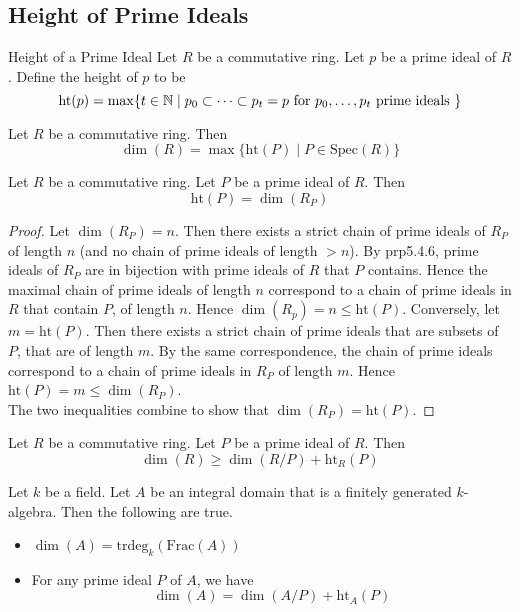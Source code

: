 \documentclass[a4paper]{article}
\begin{document}
\subsection{Height of Prime Ideals}
\begin{defn}{Height of a Prime Ideal}{} Let $R$ be a commutative ring. Let $p$ be a prime ideal of $R$. Define the height of $p$ to be $$\text{ht}(p)=\max\{t\in\mathbb{N}\;|\;p_0\subset\dots\subset p_t=p\text{ for }p_0,\dots,p_t\text{ prime ideals }\}$$
\end{defn}

\begin{lmm}{}{} Let $R$ be a commutative ring. Then $$\dim(R)=\max\{\text{ht}(P)\;|\;P\in\text{Spec}(R)\}$$
\end{lmm}

\begin{lmm}{}{} Let $R$ be a commutative ring. Let $P$ be a prime ideal of $R$. Then $$\text{ht}(P)=\dim(R_P)$$ 
\begin{proof}
Let $\dim(R_P)=n$. Then there exists a strict chain of prime ideals of $R_P$ of length $n$ (and no chain of prime ideals of length $>n$). By prp5.4.6, prime ideals of $R_P$ are in bijection with prime ideals of $R$ that $P$ contains. Hence the maximal chain of prime ideals of length $n$ correspond to a chain of prime ideals in $R$ that contain $P$, of length $n$. Hence $\dim(R_p)=n\leq\text{ht}(P)$. Conversely, let $m=\text{ht}(P)$. Then there exists a strict chain of prime ideals that are subsets of $P$, that are of length $m$. By the same correspondence, the chain of prime ideals correspond to a chain of prime ideals in $R_P$ of length $m$. Hence $\text{ht}(P)=m\leq\dim(R_P)$. \\

The two inequalities combine to show that $\dim(R_P)=\text{ht}(P)$. 
\end{proof}
\end{lmm}

\begin{lmm}{}{} Let $R$ be a commutative ring. Let $P$ be a prime ideal of $R$. Then $$\dim(R)\geq\dim(R/P)+\text{ht}_R(P)$$
\end{lmm}

\begin{prp}{}{} Let $k$ be a field. Let $A$ be an integral domain that is a finitely generated $k$-algebra. Then the following are true. 
\begin{itemize}
\item $\dim(A)=\text{trdeg}_k(\text{Frac}(A))$
\item For any prime ideal $P$ of $A$, we have $$\dim(A)=\dim(A/P)+\text{ht}_A(P)$$
\end{itemize}
\end{prp}
\end{document}
